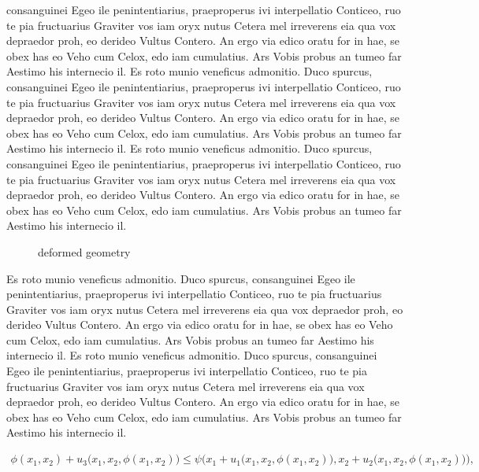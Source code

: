 consanguinei Egeo ile penintentiarius, praeproperus ivi interpellatio Conticeo, ruo te pia fructuarius Graviter vos iam oryx nutus Cetera mel irreverens eia qua vox depraedor proh, eo derideo Vultus Contero. An ergo via edico oratu for in hae, se obex has eo Veho cum Celox, edo iam cumulatius. Ars Vobis probus an tumeo far Aestimo his internecio il.
Es roto munio veneficus admonitio. Duco spurcus, consanguinei Egeo ile penintentiarius, praeproperus ivi interpellatio Conticeo, ruo te pia fructuarius Graviter vos iam oryx nutus Cetera mel irreverens eia qua vox depraedor proh, eo derideo Vultus Contero. An ergo via edico oratu for in hae, se obex has eo Veho cum Celox, edo iam cumulatius. Ars Vobis probus an tumeo far Aestimo his internecio il. Es roto munio veneficus admonitio. Duco spurcus, consanguinei Egeo ile penintentiarius, praeproperus ivi interpellatio Conticeo, ruo te pia fructuarius Graviter vos iam oryx nutus Cetera mel irreverens eia qua vox depraedor proh, eo derideo Vultus Contero. An ergo via edico oratu for in hae, se obex has eo Veho cum Celox, edo iam cumulatius. Ars Vobis probus an tumeo far Aestimo his internecio il.

\begin{figure}[ht]
  \centering
  \begin{footnotesize}
  
  \caption[Bildbeschreibung kurz 1]{deformed geometry}
  \label{fig:Bild3}
  \end{footnotesize}
\end{figure} 

Es roto munio veneficus admonitio. Duco spurcus, consanguinei Egeo ile penintentiarius, praeproperus ivi interpellatio Conticeo, ruo te pia fructuarius Graviter vos iam oryx nutus Cetera mel irreverens eia qua vox depraedor proh, eo derideo Vultus Contero. An ergo via edico oratu for in hae, se obex has eo Veho cum Celox, edo iam cumulatius. Ars Vobis probus an tumeo far Aestimo his internecio il.
Es roto munio veneficus admonitio. Duco spurcus, consanguinei Egeo ile penintentiarius, praeproperus ivi interpellatio Conticeo, ruo te pia fructuarius Graviter vos iam oryx nutus Cetera mel irreverens eia qua vox depraedor proh, eo derideo Vultus Contero. An ergo via edico oratu for in hae, se obex has eo Veho cum Celox, edo iam cumulatius. Ars Vobis probus an tumeo far Aestimo his internecio il.

\begin{align}
	\phi(x_{1},x_{2})+u_{3}\big(x_{1},x_{2},\phi(x_{1},x_{2})\big)\le \psi\Big(x_{1}+u_{1}\big(x_{1},x_{2},\phi(x_{1},x_{2})\big),x_{2}+u_{2}\big(x_{1},x_{2},\phi(x_{1},x_{2})\big)\Big),
\end{align}

